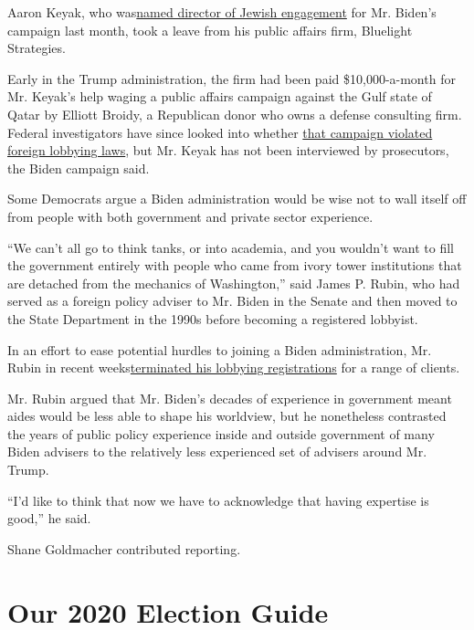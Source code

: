 Aaron Keyak, who
was\href{https://jewishinsider.com/2020/07/biden-campaign-taps-aaron-keyak-to-lead-jewish-outreach/}{named
director of Jewish engagement} for Mr. Biden's campaign last month, took
a leave from his public affairs firm, Bluelight Strategies.

Early in the Trump administration, the firm had been paid
\$10,000-a-month for Mr. Keyak's help waging a public affairs campaign
against the Gulf state of Qatar by Elliott Broidy, a Republican donor
who owns a defense consulting firm. Federal investigators have since
looked into whether
\href{https://www.nytimes3xbfgragh.onion/2019/08/13/us/politics/elliott-broidy-trump.html}{that
campaign violated foreign lobbying laws}, but Mr. Keyak has not been
interviewed by prosecutors, the Biden campaign said.

Some Democrats argue a Biden administration would be wise not to wall
itself off from people with both government and private sector
experience.

``We can't all go to think tanks, or into academia, and you wouldn't
want to fill the government entirely with people who came from ivory
tower institutions that are detached from the mechanics of Washington,''
said James P. Rubin, who had served as a foreign policy adviser to Mr.
Biden in the Senate and then moved to the State Department in the 1990s
before becoming a registered lobbyist.

In an effort to ease potential hurdles to joining a Biden
administration, Mr. Rubin in recent
weeks\href{https://efile.fara.gov/docs/6415-Short-Form-20200609-122.pdf}{terminated
his lobbying registrations} for a range of clients.

Mr. Rubin argued that Mr. Biden's decades of experience in government
meant aides would be less able to shape his worldview, but he
nonetheless contrasted the years of public policy experience inside and
outside government of many Biden advisers to the relatively less
experienced set of advisers around Mr. Trump.

``I'd like to think that now we have to acknowledge that having
expertise is good,'' he said.

Shane Goldmacher contributed reporting.

\hypertarget{our-2020-election-guide}{%
\section{Our 2020 Election Guide}\label{our-2020-election-guide}}

